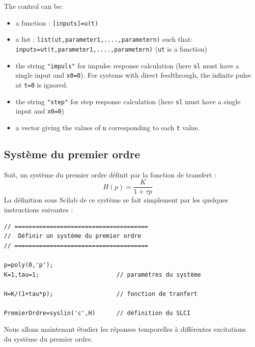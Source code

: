 \begin{doc}
\begin{itemize}
    The control can be:
    \begin{itemize}
        \item a function : \verb?[inputs]=u(t)?
        \item a list : \verb?list(ut,parameter1,....,parametern)? such that: \verb?inputs=ut(t,parameter1,....,parametern)? 
    (\verb?ut? is a function)
        \item the string \verb?"impuls"? for impulse response calculation (here \verb?sl? must have a single input and \verb?x0=0?). For systems with direct feedthrough, the infinite pulse at \verb?t=0? is ignored.
        \item the string \verb?"step"? for step response calculation (here \verb?sl? must have a single input and \verb?x0=0?)
        \item a vector giving the values of \verb?u? corresponding to each \verb?t? value.
\end{itemize}
\end{itemize}
\end{doc}


\subsection{Système du premier ordre}

Soit, un système du premier ordre définit par la fonction de transfert : 
$$
H(p)=\dfrac{K}{1+\tau p }
$$
La définition sous Scilab de ce système se fait simplement par les quelques instructions suivantes :
\begin{code}
\begin{verbatim}
// ======================================
//  Définir un système du premier ordre
// ======================================

p=poly(0,'p');
K=1,tau=1;                      // paramètres du système

H=K/(1+tau*p);                  // fonction de tranfert

PremierOrdre=syslin('c',H)      // définition du SLCI
\end{verbatim}
\end{code}


Nous allons maintenant étudier les réponses temporelles 
à différentes excitations du système du premier ordre.
